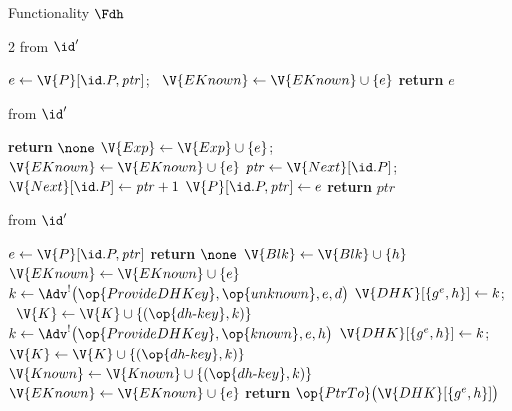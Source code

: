 \begin{interface}[nofloat]{Functionality $\Fdh$ \\
}
{\begin{multicols}{2}
 \quad from $\id'$
\begin{algorithmic}[1]
\algcont
{}
\State $e \gets \V{P}[\id.P, \mathit{ptr}]$; \ $\V{EKnown} \gets \V{EKnown} \cup \{e\}$ \label{ln:dhretrieve}
\State \textbf{return} $e$
\algsave
\end{algorithmic}
\vspace{1.4ex}

\columnbreak

 \quad from $\id'$
\begin{algorithmic}[1]
\algcont
{}
  \State \textbf{return} $\none$ \label{ln:dhexpguess}
\EndIf
\State $\V{Exp} \gets \V{Exp} \cup \{e\}$; \ $\V{EKnown} \gets \V{EKnown} \cup \{e\}$
\State $\mathit{ptr} \gets \V{Next}[\id.P]$; \ $\V{Next}[\id.P] \gets \mathit{ptr} + 1$
\State $\V{P}[\id.P, \mathit{ptr}] \gets e$
\State \textbf{return} $\mathit{ptr}$
\algsave
\end{algorithmic}
\vspace{1.4ex}

 \quad from $\id'$
\begin{algorithmic}[1]
\algcont
{}
\State $e \gets \V{P}[\id.P, \mathit{ptr}]$
  \State \textbf{return} $\none$
\EndIf
\State $\V{Blk} \gets \V{Blk} \cup \{h\}$ \label{ln:dhblockused}
  \State $\V{EKnown} \gets \V{EKnown} \cup \{e\}$ \label{ln:dhselfpair}
\EndIf
{}
  \State $k \gets \Adv^{!}\bigl(\op{ProvideDHKey}, \op{unknown}, e, d\bigr)$ \label{ln:dhunknown}
  \State $\V{DHK}[\{g^{e}, h\}] \gets k$; \ $\V{K} \gets \V{K} \cup \{(\op{dh\text{-}key}, k)\}$
\EndIf
{}
  \State $k \gets \Adv^{!}\bigl(\op{ProvideDHKey}, \op{known}, e, h\bigr)$ \label{ln:dhknown}
   \label{ln:dhkeyguess}
  \State $\V{DHK}[\{g^{e}, h\}] \gets k$; \ $\V{K} \gets \V{K} \cup \{(\op{dh\text{-}key}, k)\}$
  \State $\V{Known} \gets \V{Known} \cup \{(\op{dh\text{-}key}, k)\}$
    \State $\V{EKnown} \gets \V{EKnown} \cup \{e\}$ \label{ln:dhforeign}
  \EndIf
\EndIf
\State \textbf{return} $\op{PtrTo}\bigl(\V{DHK}[\{g^{e}, h\}]\bigr)$ \label{ln:dhsamepair}
\algsave
\end{algorithmic}
\vspace{1.4ex}


\end{multicols}}
\end{interface}

